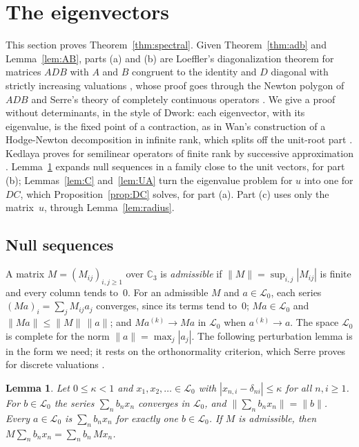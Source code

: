 \documentclass[11pt]{amsart}
\newtheorem{lemma}[theorem]{Lemma}
\theoremstyle{definition}
\numberwithin{equation}{section}
\newcommand{\lean}[1]{\ignorespaces}
\newcommand{\Cp}{\mathbb{C}_3}
\newcommand{\Lc}{\mathcal{L}_0}
\begin{document}
\section{The eigenvectors}\label{sec:spectral}

This section proves Theorem~\ref{thm:spectral}. Given Theorem~\ref{thm:adb} and Lemma~\ref{lem:AB}, parts (a) and (b) are Loeffler's diagonalization theorem for matrices $ADB$ with $A$ and $B$ congruent to the identity and $D$ diagonal with strictly increasing valuations \cite[\S6]{Loe07}, whose proof goes through the Newton polygon of $ADB$ \cite[Lemma~5]{BC05} and Serre's theory of completely continuous operators \cite[\S\S5 and~7]{Ser62}. We give a proof without determinants, in the style of Dwork: each eigenvector, with its eigenvalue, is the fixed point of a contraction, as in Wan's construction of a Hodge-Newton decomposition in infinite rank, which splits off the unit-root part \cite[Lemma~3.4]{Wan99}. Kedlaya proves \cite[Lemma~5]{BC05} for semilinear operators of finite rank by successive approximation \cite[Proposition~5.9]{Ked04}. Lemma~\ref{lem:perturb} expands null sequences in a family close to the unit vectors, for part (b); Lemmas~\ref{lem:C} and~\ref{lem:UA} turn the eigenvalue problem for $u$ into one for $DC$, which Proposition~\ref{prop:DC} solves, for part (a). Part (c) uses only the matrix~$u$, through Lemma~\ref{lem:radius}.

\subsection{Null sequences}
A matrix $M=(M_{ij})_{i,j\ge1}$ over $\Cp$ is \emph{admissible} if $\|M\|=\sup_{i,j}|M_{ij}|$ is finite and every column tends to~$0$. For an admissible $M$ and $a\in\Lc$, each series $(Ma)_i=\sum_jM_{ij}a_j$ converges, since its terms tend to~$0$; $Ma\in\Lc$ and $\|Ma\|\le\|M\|\,\|a\|$; and $M a^{(k)}\to Ma$ in $\Lc$ when $a^{(k)}\to a$. The space $\Lc$ is complete for the norm $\|a\|=\max_j|a_j|$. The following perturbation lemma is \cite[Lemma~3.2]{Con00} in the form we need; it rests on the orthonormality criterion, which Serre proves for discrete valuations \cite[\S1, Lemme~1]{Ser62}.

\begin{lemma}\label{lem:perturb}\lean{CalegariSlopes.Spectral.NearBasis.exists_expand_eq, CalegariSlopes.Spectral.NearBasis.eq_zero_of_expand_eq_zero, CalegariSlopes.Spectral.NearBasis.isC0_expand, CalegariSlopes.Spectral.NearBasis.bact_expand}
Let $0\le\kappa<1$ and $x_1,x_2,\ldots\in\Lc$ with $|x_{n,i}-\delta_{ni}|\le\kappa$ for all $n,i\ge1$. For $b\in\Lc$ the series $\sum_nb_nx_n$ converges in $\Lc$, and $\|\sum_nb_nx_n\|=\|b\|$. Every $a\in\Lc$ is $\sum_nb_nx_n$ for exactly one $b\in\Lc$. If $M$ is admissible, then $M\sum_nb_nx_n=\sum_nb_n\,Mx_n$.
\end{lemma}
\end{document}

